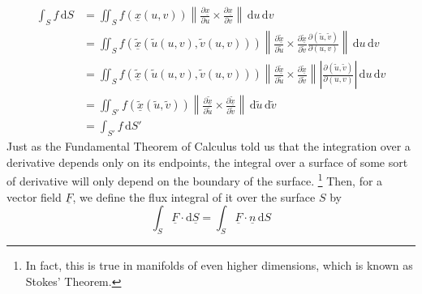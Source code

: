 \begin{align*}
    \int_S f\,\mathrm dS&=\iint_Sf(\underline{x}(u,v))\left\|\frac{\partial\underline{x}}{\partial u}\times\frac{\partial\underline{x}}{\partial v}\right\|\,\mathrm du\,\mathrm dv\\
    &=\iint_{S}f(\underline{\tilde{x}}(\tilde{u}(u,v),\tilde{v}(u,v)))\left\|\frac{\partial\underline{\tilde{x}}}{\partial\tilde{u}}\times\frac{\partial\underline{\tilde{x}}}{\partial\tilde{v}}\frac{\partial (\tilde{u},\tilde{v})}{\partial (u,v)}\right\|\,\mathrm du\,\mathrm dv\\
    &=\iint_{S}f(\underline{\tilde{x}}(\tilde{u}(u,v),\tilde{v}(u,v)))\left\|\frac{\partial\underline{\tilde{x}}}{\partial\tilde{u}}\times\frac{\partial\underline{\tilde{x}}}{\partial\tilde{v}}\right\|\left|\frac{\partial (\tilde{u},\tilde{v})}{\partial (u,v)}\right|\,\mathrm du\,\mathrm dv\\
    &=\iint_{S'}f(\underline{\tilde{x}}(\tilde{u},\tilde{v}))\left\|\frac{\partial\underline{\tilde{x}}}{\partial \tilde{u}}\times\frac{\partial\underline{\tilde{x}}}{\partial\tilde{v}}\right\|\,\mathrm d\tilde{u}\,\mathrm d\tilde{v}\\
    &=\int_{S'} f\,\mathrm dS'
\end{align*}
Just as the Fundamental Theorem of Calculus told us that the integration over a derivative depends only on its endpoints, the integral over a surface of some sort of derivative will only depend on the boundary of the surface.
\footnote{In fact, this is true in manifolds of even higher dimensions, which is known as Stokes' Theorem.}
Then, for a vector field $\underline{F}$, we define the flux integral of it over the surface $S$ by
$$\int_S\underline{F}\cdot\mathrm d\underline{S}=\int_S\underline{F}\cdot\underline{n}\,\mathrm dS$$